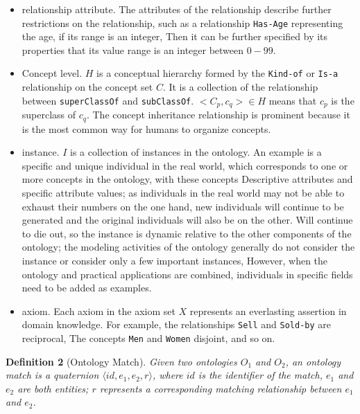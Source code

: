 \documentclass[twoside]{article}
\begin{document}
\begin{multicols}{2}
\begin {itemize}
Recursive relationships are more worthy of attention, for example, the \texttt {Part-of} relationship between part and the whole expressing concepts.
\item relationship attribute. The attributes of the relationship describe further restrictions on the relationship, such as a relationship \texttt {Has-Age} representing the age, if its range is an integer,
Then it can be further specified by its properties that its value range is an integer between $ 0-99 $.
\item Concept level. $ H $ is a conceptual hierarchy formed by the \texttt {Kind-of} or \texttt {Is-a} relationship on the concept set $ C $.
It is a collection of the relationship between \texttt {superClassOf} and \texttt {subClassOf}. $ <C_p, c_q> \in H $ means that $ c_p $ is the superclass of $ c_q $.
The concept inheritance relationship is prominent because it is the most common way for humans to organize concepts.
\item instance. $ I $ is a collection of instances in the ontology. An example is a specific and unique individual in the real world, which corresponds to one or more concepts in the ontology, with these concepts
Descriptive attributes and specific attribute values; as individuals in the real world may not be able to exhaust their numbers on the one hand, new individuals will continue to be generated and the original individuals will also be on the other.
Will continue to die out, so the instance is dynamic relative to the other components of the ontology; the modeling activities of the ontology generally do not consider the instance or consider only a few important instances,
However, when the ontology and practical applications are combined, individuals in specific fields need to be added as examples.
\item axiom. Each axiom in the axiom set $ X $ represents an everlasting assertion in domain knowledge. For example, the relationships \texttt {Sell} and \texttt {Sold-by} are reciprocal,
The concepts \texttt {Men} and \texttt {Women} disjoint, and so on.
\end {itemize}



{\bf Definition 2} (Ontology Match). {\it Given two ontologies $ {O_1} $ and $ {O_2} $, an ontology match is a quaternion $ \langle id, {e_1}, {e_2}, r \rangle $, where $ id $ is the identifier of the match, $ {e_1} $ and $ {e_2} $ are both entities; $ r $ represents a corresponding matching relationship between $ {e_1} $ and $ {e_2} $.}


\end{multicols}
\end{document}
